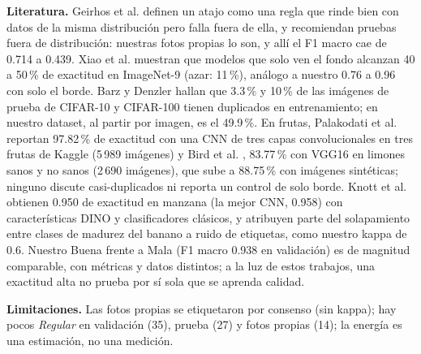 \documentclass[conference]{IEEEtran}
\begin{document}
\textbf{Literatura.} Geirhos et al. \cite{geirhos2020shortcut} definen un atajo como una regla que rinde bien con datos de la misma distribuci\'on pero falla fuera de ella, y recomiendan pruebas fuera de distribuci\'on: nuestras fotos propias lo son, y all\'i el F1 macro cae de 0.714 a 0.439. Xiao et al. \cite{xiao2020noise} muestran que modelos que solo ven el fondo alcanzan 40 a 50\,\% de exactitud en ImageNet-9 (azar: 11\,\%), an\'alogo a nuestro 0.76 a 0.96 con solo el borde. Barz y Denzler \cite{barz2020purging} hallan que 3.3\,\% y 10\,\% de las im\'agenes de prueba de CIFAR-10 y CIFAR-100 tienen duplicados en entrenamiento; en nuestro dataset, al partir por imagen, es el 49.9\,\%. En frutas, Palakodati et al. \cite{palakodati2020fresh} reportan 97.82\,\% de exactitud con una CNN de tres capas convolucionales en tres frutas de Kaggle (5\,989 im\'agenes) y Bird et al. \cite{bird2022fruit}, 83.77\,\% con VGG16 en limones sanos y no sanos (2\,690 im\'agenes), que sube a 88.75\,\% con im\'agenes sint\'eticas; ninguno discute casi-duplicados ni reporta un control de solo borde. Knott et al. \cite{knott2023facilitated} obtienen 0.950 de exactitud en manzana (la mejor CNN, 0.958) con caracter\'isticas DINO y clasificadores cl\'asicos, y atribuyen parte del solapamiento entre clases de madurez del banano a ruido de etiquetas, como nuestro kappa de 0.6. Nuestro Buena frente a Mala (F1 macro 0.938 en validaci\'on) es de magnitud comparable, con m\'etricas y datos distintos; a la luz de estos trabajos, una exactitud alta no prueba por s\'i sola que se aprenda calidad.

\textbf{Limitaciones.} Las fotos propias se etiquetaron por consenso (sin kappa); hay pocos \emph{Regular} en validaci\'on (35), prueba (27) y fotos propias (14); la energ\'ia es una estimaci\'on, no una medici\'on.
\end{document}
